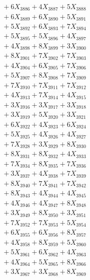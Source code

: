 \documentclass[a4paper,10pt]{article}
\begin{document}
{\begin{align}
&\;  + 6 X_{3886} + 4 X_{3887} + 5 X_{3888} \\[0.3ex]
&\;  + 6 X_{3889} + 6 X_{3890} + 5 X_{3891} \\[0.3ex]
&\;  + 5 X_{3892} + 6 X_{3893} + 7 X_{3894} \\[0.3ex]
&\;  + 5 X_{3895} + 5 X_{3896} + 4 X_{3897} \\[0.3ex]
&\;  + 4 X_{3898} + 8 X_{3899} + 3 X_{3900} \\[0.3ex]
&\;  + 8 X_{3901} + 7 X_{3902} + 7 X_{3903} \\[0.3ex]
&\;  + 4 X_{3904} + 6 X_{3905} + 7 X_{3906} \\[0.3ex]
&\;  + 5 X_{3907} + 8 X_{3908} + 7 X_{3909} \\[0.5ex]\allowbreak
&\;  + 7 X_{3910} + 7 X_{3911} + 7 X_{3912} \\[0.3ex]
&\;  + 4 X_{3913} + 7 X_{3914} + 4 X_{3915} \\[0.3ex]
&\;  + 3 X_{3916} + 3 X_{3917} + 3 X_{3918} \\[0.3ex]
&\;  + 3 X_{3919} + 5 X_{3920} + 3 X_{3921} \\[0.3ex]
&\;  + 6 X_{3922} + 4 X_{3923} + 6 X_{3924} \\[0.3ex]
&\;  + 5 X_{3925} + 4 X_{3926} + 4 X_{3927} \\[0.3ex]
&\;  + 7 X_{3928} + 3 X_{3929} + 8 X_{3930} \\[0.3ex]
&\;  + 8 X_{3931} + 8 X_{3932} + 4 X_{3933} \\[0.3ex]
&\;  + 7 X_{3934} + 8 X_{3935} + 7 X_{3936} \\[0.3ex]
&\;  + 3 X_{3937} + 4 X_{3938} + 7 X_{3939} \\[0.5ex]\allowbreak
&\;  + 8 X_{3940} + 7 X_{3941} + 7 X_{3942} \\[0.3ex]
&\;  + 8 X_{3943} + 4 X_{3944} + 4 X_{3945} \\[0.3ex]
&\;  + 4 X_{3946} + 4 X_{3947} + 8 X_{3948} \\[0.3ex]
&\;  + 3 X_{3949} + 8 X_{3950} + 3 X_{3951} \\[0.3ex]
&\;  + 7 X_{3952} + 7 X_{3953} + 5 X_{3954} \\[0.3ex]
&\;  + 6 X_{3955} + 6 X_{3956} + 8 X_{3957} \\[0.3ex]
&\;  + 4 X_{3958} + 8 X_{3959} + 5 X_{3960} \\[0.3ex]
&\;  + 5 X_{3961} + 6 X_{3962} + 4 X_{3963} \\[0.3ex]
&\;  + 4 X_{3964} + 5 X_{3965} + 8 X_{3966} \\[0.3ex]
&\;  + 3 X_{3967} + 3 X_{3968} + 8 X_{3969} \\[0.5ex]\allowbreak

\end{align}}
\end{document}
